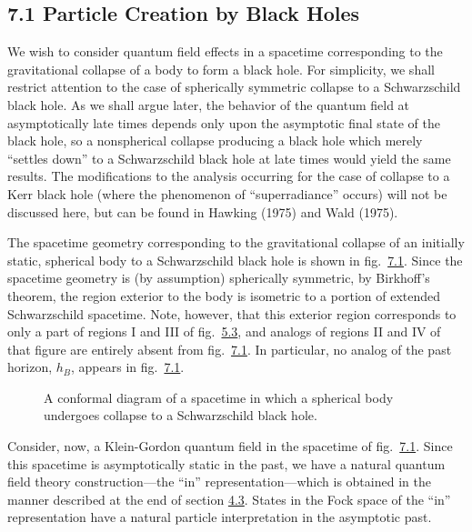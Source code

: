 \documentclass[11pt,a4paper]{article}
\begin{document}
\subsection*{7.1 Particle Creation by Black Holes}\hypertarget{sec:7.1}{}

We wish to consider quantum field effects in a spacetime corresponding to the gravitational collapse of a body to form a black hole. For simplicity, we shall restrict attention to the case of spherically symmetric collapse to a Schwarzschild black hole. As we shall argue later, the behavior of the quantum field at asymptotically late times depends only upon the asymptotic final state of the black hole, so a nonspherical collapse producing a black hole which merely ``settles down'' to a Schwarzschild black hole at late times would yield the same results. The modifications to the analysis occurring for the case of collapse to a Kerr black hole (where the phenomenon of ``superradiance'' occurs) will not be discussed here, but can be found in Hawking (1975) and Wald (1975).

The spacetime geometry corresponding to the gravitational collapse of an initially static, spherical body to a Schwarzschild black hole is shown in fig.~\hyperref[fig:7.1]{7.1}. Since the spacetime geometry is (by assumption) spherically symmetric, by Birkhoff's theorem, the region exterior to the body is isometric to a portion of extended Schwarzschild spacetime. Note, however, that this exterior region corresponds to only a part of regions I and III of fig.~\hyperref[fig:5.3]{5.3}, and analogs of regions II and IV of that figure are entirely absent from fig.~\hyperref[fig:7.1]{7.1}. In particular, no analog of the past horizon, \(h_{B}\), appears in fig.~\hyperref[fig:7.1]{7.1}.

\begin{figure}[htbp]
\centering
\renewcommand{\thefigure}{7.1}

\caption{A conformal diagram of a spacetime in which a spherical body undergoes collapse to a Schwarzschild black hole.}\label{fig:7.1}
\end{figure}

\hypertarget{source-166}{}

Consider, now, a Klein-Gordon quantum field in the spacetime of fig.~\hyperref[fig:7.1]{7.1}. Since this spacetime is asymptotically static in the past, we have a natural quantum field theory construction---the ``in'' representation---which is obtained in the manner described at the end of section \hyperlink{sec:4.3}{4.3}. States in the Fock space of the ``in'' representation have a natural particle interpretation in the asymptotic past.
\end{document}
